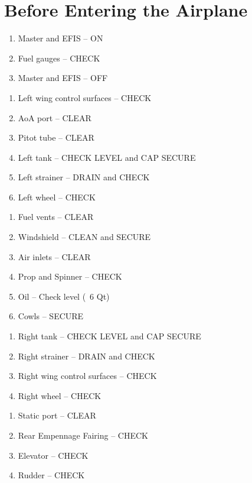 \section{Before Entering the Airplane}
\begin{enumerate}[(1)]
\item Master and EFIS -- ON
\item Fuel gauges -- CHECK
\item Master and EFIS -- OFF
\end{enumerate} 	
\begin{enumerate}[(1)]
\item Left wing control surfaces -- CHECK
\item AoA port -- CLEAR
\item Pitot tube -- CLEAR
\item Left tank -- CHECK LEVEL and CAP SECURE
\item Left strainer -- DRAIN and CHECK
\item Left wheel -- CHECK
\end{enumerate}
\begin{enumerate}[(1)]
\item Fuel vents -- CLEAR
\item Windshield -- CLEAN and SECURE
\item Air inlets -- CLEAR
\item Prop and Spinner -- CHECK
\item Oil -- Check level (~6 Qt)
\item Cowls -- SECURE
\end{enumerate}
\begin{enumerate}[(1)]
\item Right tank -- CHECK LEVEL and CAP SECURE
\item Right strainer -- DRAIN and CHECK
\item Right wing control surfaces -- CHECK
\item Right wheel -- CHECK 
\end{enumerate}
\begin{enumerate}[(1)]
\item Static port -- CLEAR
\item Rear Empennage Fairing -- CHECK
\item Elevator -- CHECK
\item Rudder -- CHECK
\end{enumerate}

